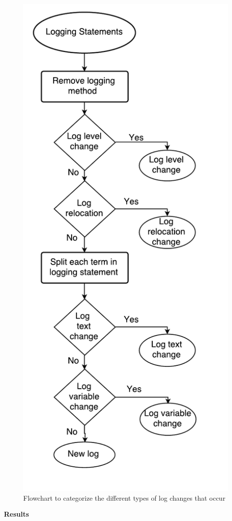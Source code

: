 \begin{figure}[tb]
	\centering
	\includegraphics[width=0.75\linewidth]{Flowchart2}
	\caption{Flowchart to categorize the different types of log changes that occur}
	\label{fig:Flowchart2}
\end{figure}



\noindent \textbf{Results}

